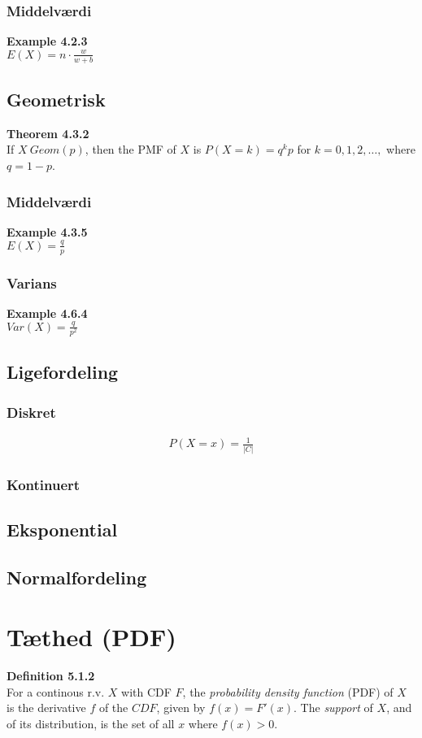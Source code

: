 \documentclass{article}
\begin{document}
\subsubsection*{Middelværdi}
\textbf{Example 4.2.3}\\
$E(X) = n \cdot \frac{w}{w+b}$
\subsection*{Geometrisk}
\textbf{Theorem 4.3.2}\\
If $X ~ Geom(p)$, then the PMF of $X$ is $P(X = k) = q^k p$ for $k = 0,1,2, \hdots,$ where $q = 1 - p$.
\subsubsection*{Middelværdi}
\textbf{Example 4.3.5}\\
$E(X) = \frac{q}{p}$
\subsubsection*{Varians}
\textbf{Example 4.6.4}\\
$Var(X) = \frac{q}{p^2}$
\subsection*{Ligefordeling}
\subsubsection*{Diskret}
\begin{align*}
  P(X = x) = \frac{1}{|C|}
\end{align*}
\subsubsection*{Kontinuert}

\subsection*{Eksponential}

\subsection*{Normalfordeling}

\section*{Tæthed (PDF)}
\textbf{Definition 5.1.2}\\
For a continous r.v. $X$ with CDF $F$, the \textit{probability density function} (PDF) of $X$ is the derivative $f$ of the $CDF$, given by $f(x) = F'(x)$. The \textit{support} of $X$, and of its distribution, is the set of all $x$ where $f(x) > 0$.
\end{document}
